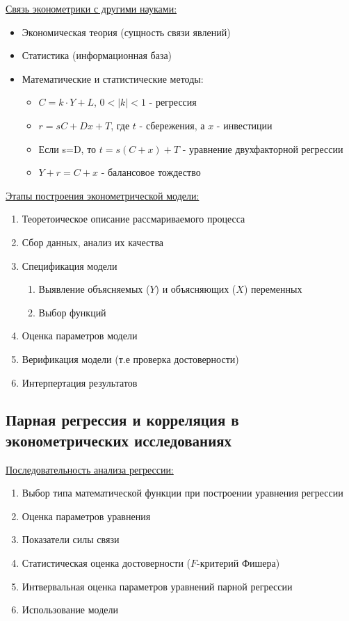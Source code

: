 \documentclass[aps,%
12pt,%
final,%
oneside,
onecolumn,%
musixtex, %
superscriptaddress,%
centertags]{article} %
\begin{document}
\underline{Связь эконометрики с другими науками:}
\begin{itemize} 
  \item Экономическая теория (сущность связи явлений)
  \item Статистика (информационная база)
  \item Математические и статистические методы:
  \begin{itemize} 
  	\item $C=k\cdot Y+L$, $0<|k|<1$ - регрессия
  	\item $r=sC+Dx+T$, где $t$ - сбережения, а $x$ - инвестиции
  	\item Если s=D, то $t=s(C+x)+T$  - уравнение двухфакторной регрессии
  	\item $Y+r=C+x$ - балансовое тождество 
  \end{itemize} 
\end{itemize}

\underline{Этапы построения эконометрической модели:}
\begin{enumerate}
	
	\item Теоретоическое описание рассмариваемого процесса
	\item Сбор данных, анализ их качества
	\item Спецификация модели
	\begin{enumerate}
	\item Выявление объясняемых ($Y$) и объясняющих ($X$) переменных 
	\item Выбор функций
	\end{enumerate}
	\item Оценка параметров модели
	\item Верификация модели (т.е проверка достоверности)
	\item Интерпертация результатов 

\end{enumerate}

\subsection{Парная регрессия и корреляция в эконометрических исследованиях}
\underline{Последовательность анализа регрессии:}
\begin{enumerate}
	\item Выбор типа математической функции при построении уравнения регрессии
	\item Оценка параметров уравнения
	\item Показатели силы связи
	\item Статистическая оценка достоверности ($F$-критерий Фишера)
	\item Интвервальная оценка параметров уравнений парной регрессии
	\item Использование модели
\end{enumerate}
\end{document}
